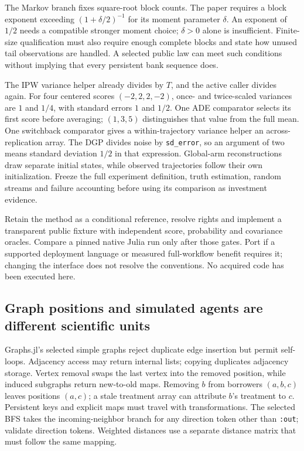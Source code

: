 The Markov branch fixes square-root block counts. The paper requires a block
exponent exceeding $(1+\delta/2)^{-1}$ for its moment parameter $\delta$.
An exponent of $1/2$ needs a compatible stronger moment choice; $\delta>0$
alone is insufficient. Finite-size qualification must also require enough
complete blocks and state how unused tail observations are handled. A selected
public law can meet such conditions without implying that every persistent
bank sequence does.\citep{exec25_onet_dml,exec25_onet_paper}

The IPW variance helper already divides by $T$, and the active caller divides
again. For four centered scores $(-2,2,2,-2)$, once- and twice-scaled variances
are $1$ and $1/4$, with standard errors $1$ and $1/2$. One ADE comparator
selects its first score before averaging; $(1,3,5)$ distinguishes that value
from the full mean. One switchback comparator gives a within-trajectory
variance helper an across-replication array. The DGP divides noise by
\texttt{sd\_error}, so an argument of two means standard deviation $1/2$
in that expression. Global-arm reconstructions draw separate initial states,
while observed trajectories follow their own initialization. Freeze the full
experiment definition, truth estimation, random streams and failure accounting
before using its comparison as investment evidence.
\citep{exec25_onet_dml,exec25_onet_choice}

Retain the method as a conditional reference, resolve rights and implement a
transparent public fixture with independent score, probability and covariance
oracles. Compare a pinned native Julia run only after those gates. Port if a
supported deployment language or measured full-workflow benefit requires it;
changing the interface does not resolve the conventions. No acquired code has
been executed here.\citep{exec25_onet_choice}

\subsection{Graph positions and simulated agents are different scientific units}

Graphs.jl's selected simple graphs reject duplicate edge insertion but permit
self-loops. Adjacency access may return internal lists; copying duplicates
adjacency storage. Vertex removal swaps the last vertex into the removed
position, while induced subgraphs return new-to-old maps. Removing $b$ from
borrowers $(a,b,c)$ leaves positions $(a,c)$; a stale treatment array can
attribute $b$'s treatment to $c$. Persistent keys and explicit maps must travel
with transformations. The selected BFS takes the incoming-neighbor branch
for any direction token other than \texttt{:out}; validate direction tokens.
Weighted distances use a separate distance matrix that must follow the same
mapping.\citep{exec25_onet_graphs,exec25_onet_choice}

